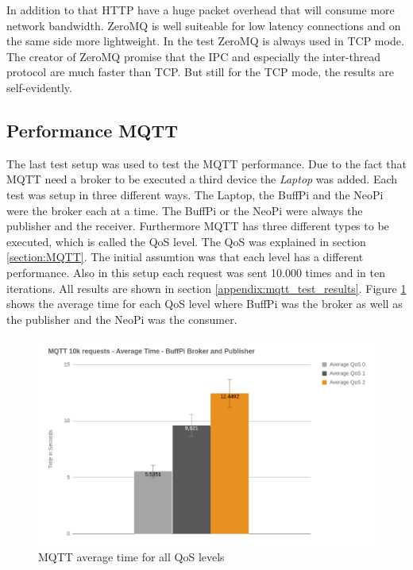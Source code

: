 In addition to that \ac{HTTP} have a huge packet overhead that will consume more network bandwidth.
ZeroMQ is well suiteable for low latency connections and on the same side more lightweight.
In the test ZeroMQ is always used in \ac{TCP} mode.
The creator of ZeroMQ promise that the \ac{IPC} and especially the inter-thread protocol are much faster than \ac{TCP}.\autocite[cf.]{ZeroMQ:UicastTransports}
But still for the \ac{TCP} mode, the results are self-evidently.


\subsection{Performance MQTT}
The last test setup was used to test the MQTT performance.
Due to the fact that MQTT need a broker to be executed a third device the \textit{Laptop} was added.
Each test was setup in three different ways.
The Laptop, the BuffPi and the NeoPi were the broker each at a time.
The BuffPi or the NeoPi were always the publisher and the receiver.
Furthermore MQTT has three different types to be executed, which is called the \ac{QoS} level.
The \ac{QoS} was explained in section \ref{section:MQTT}.
The initial assumtion was that each level has a different performance.
Also in this setup each request was sent 10.000 times and in ten iterations.
All results are shown in section \ref{appendix:mqtt_test_results}.
Figure \ref{fig:performance_mqtt_average_time_all_qos} shows the average time for each \ac{QoS} level where BuffPi was the broker as well as the publisher and the NeoPi was the consumer.

\begin{figure}[H]
    \centering
    \includegraphics[width=\textwidth]{resources/images/performance_mqtt_average_time.png}
    \caption[MQTT average time for all QoS levels]{MQTT average time for all QoS levels}
    \label{fig:performance_mqtt_average_time_all_qos}
\end{figure}

